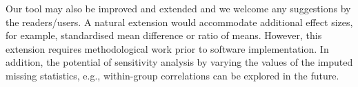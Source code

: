 \documentclass[AMA,STIX1COL]{WileyNJD-v2}
\begin{document}
Our tool may also be improved and extended and we welcome any suggestions by the readers/users. A natural extension would accommodate additional effect sizes, for example, standardised mean difference or ratio of means. However, this extension requires methodological work prior to software implementation. In addition, the potential of sensitivity analysis by varying the values of the imputed missing statistics, e.g., within-group correlations can be explored in the future.

%

\clearpage


\end{document}
